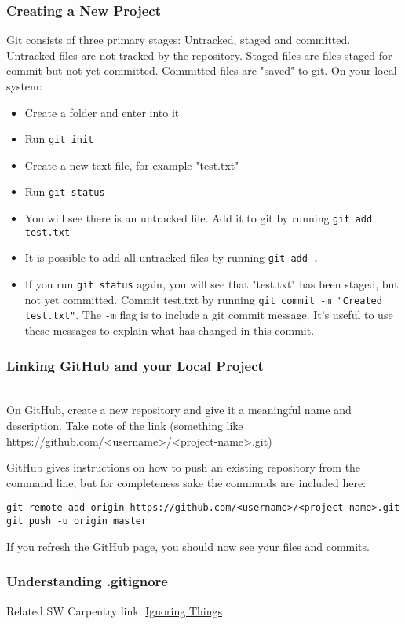 \subsubsection{Creating a New Project}
Git consists of three primary stages: Untracked, staged and committed. Untracked files are not tracked by the repository. Staged files are files staged for commit but not yet committed. Committed files are "saved" to git.
On your local system:
\begin{itemize}
    \item Create a folder and enter into it
    \item Run \verb|git init|
    \item Create a new text file, for example "test.txt"
    \item Run \verb|git status|
    \item You will see there is an untracked file. Add it to git by running \verb|git add test.txt|
    \item It is possible to add all untracked files by running \verb|git add .|
    \item If you run \verb|git status| again, you will see that "test.txt" has been staged, but not yet committed. Commit test.txt by running \verb|git commit -m "Created test.txt"|. The \verb|-m| flag is to include a git commit message. It's useful to use these messages to explain what has changed in this commit.
\end{itemize}

\subsubsection{Linking GitHub and your Local Project}\mbox{}\\
On GitHub, create a new repository and give it a meaningful name and description. Take note of the link (something like https://github.com/\textless username\textgreater /\textless project-name\textgreater .git)

GitHub gives instructions on how to push an existing repository from the command line, but for completeness sake the commands are included here:
\begin{verbatim}
git remote add origin https://github.com/<username>/<project-name>.git
git push -u origin master    
\end{verbatim}

If you refresh the GitHub page, you should now see your files and commits.

\subsubsection{Understanding .gitignore}
Related SW Carpentry link: \href{https://swcarpentry.github.io/git-novice/06-ignore/index.html}{Ignoring Things}

